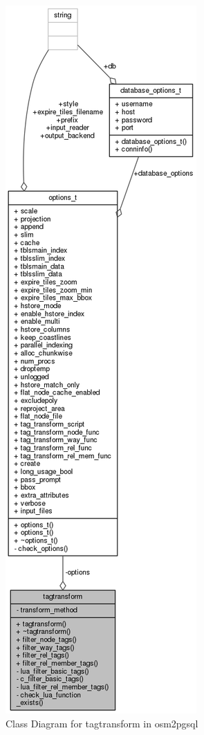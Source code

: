 \begin{figure}
    \centering
    \includegraphics[scale=.5]{input/images/class_tagtransform.png}
    \caption{Class Diagram for tagtransform in osm2pgsql}
    \label{fig:collaborative}
\end{figure}

